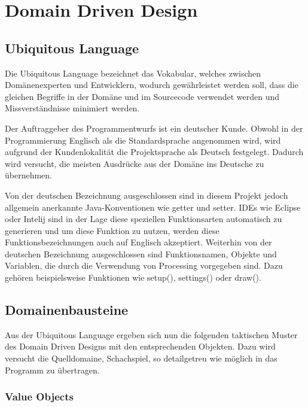 \chapter{Domain Driven Design}
\label{txt:ddd}

\section{Ubiquitous Language}

Die Ubiquitous Language bezeichnet das Vokabular, welches zwischen Domänenexperten
und Entwicklern, wodurch gewährleistet werden soll, dass die gleichen Begriffe in der
Domäne und im Sourcecode verwendet werden und Missverständnisse minimiert werden.

Der Auftraggeber des Programmentwurfs ist ein deutscher Kunde. 
Obwohl in der Programmierung Englisch als die Standardsprache angenommen wird, wird aufgrund der Kundenlokalität die Projektsprache als \glqq Deutsch\grqq{} festgelegt. 
Dadurch wird versucht, die meisten Ausdrücke aus der Domäne ins Deutsche zu übernehmen. 

Von der deutschen Bezeichnung ausgeschlossen sind in diesem Projekt jedoch allgemein anerkannte Java-Konventionen wie \glqq getter\grqq{} und \glqq{} setter\grqq{}. 
IDEs wie Eclipse oder Intelij sind in der Lage diese speziellen Funktionsarten automatisch zu generieren und um diese Funktion zu nutzen, werden diese Funktionsbezeichnungen auch auf Englisch akzeptiert. 
Weiterhin von der deutschen Bezeichnung ausgeschlossen sind Funktionsnamen, Objekte und Variablen, die durch die Verwendung von Processing vorgegeben sind. 
Dazu gehören beispielsweise Funktionen  wie \glqq setup(), settings()\grqq{} oder \glqq draw()\grqq{}.

\section{Domainenbausteine}

Aus der Ubiquitous Language ergeben sich nun die folgenden taktischen Muster des Domain
Driven Designs mit den entsprechenden Objekten.
Dazu wird versucht die Quelldomaine, Schachspiel, so detailgetreu wie möglich in das Programm zu übertragen. 

\newpage

\subsection{Value Objects}

